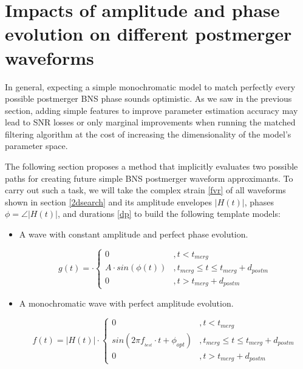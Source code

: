 \FloatBarrier





\section{Impacts of amplitude and phase evolution on different postmerger  waveforms}

In general, expecting a simple monochromatic model to match perfectly every possible postmerger BNS phase sounds optimistic. As we saw in the previous section, adding simple features to improve parameter estimation accuracy may lead to SNR losses or only marginal improvements when running the matched filtering algorithm at the cost of increasing the dimensionality of the model's parameter space.

The following section proposes a method that implicitly evaluates two possible paths for creating future simple  BNS postmerger waveform approximants. To carry out such a task, we will take the complex strain \ref{fvr} of all waveforms shown in section \ref{2dsearch} and its amplitude envelopes $|H(t)|$, phases $\phi=\angle |H(t)|$, and durations \ref{dp} to build the following template models:

\begin{itemize}[leftmargin=*]
\item A wave with constant amplitude and perfect phase evolution.

\begin{equation}\label{pha-evol}
g(t) = \cdot \begin{cases} 
      0 &, t< t_{merg} \\
      A \cdot sin(\phi(t)) &, t_{merg} \leq t \leq t_{merg} + d_{postm} \\
      0 &, t> t_{merg} + d_{postm}
   \end{cases}
\end{equation}


\item A monochromatic wave with perfect amplitude evolution.

\begin{equation}\label{a-evol}
f(t) = |H(t)| \cdot \begin{cases} 
      0 &, t< t_{merg} \\
      sin(2\pi f_{_{best}}\cdot t + \phi_{opt}) &, t_{merg} \leq t \leq t_{merg} + d_{postm} \\
      0 &, t> t_{merg} + d_{postm}
   \end{cases}
\end{equation}

\end{itemize}


